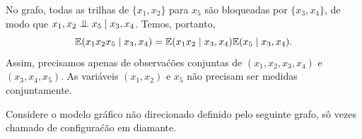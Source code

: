 \begin{exenumerate}
    \begin{solution}
        
        No grafo, todas as trilhas de $\{x_1,x_2\}$ para $x_5$ s\~ao bloqueadas por $\{x_3,x_4\}$, de modo que $x_1, x_2 \mathrel{\perp\mspace{-10mu}\perp} x_5 \mid x_3, x_4$. Temos, portanto,
        $$\mathbb{E} (x_1 x_2 x_5 \mid x_3,x_4) =  \mathbb{E} (x_1 x_2 \mid x_3,x_4)  \mathbb{E} (x_5 \mid x_3,x_4).$$
        Assim, precisamos apenas de observa\'c\~oes conjuntas de $(x_1, x_2, x_3, x_4)$ e $(x_3, x_4,x_5)$. As vari\'aveis $(x_1,x_2)$ e $x_5$ n\~ao precisam ser medidas conjuntamente.
        
    \end{solution}
    
\end{exenumerate}


\label{ex:factorisation-independencies-diamond}

Considere o modelo gr\'afico n\~ao direcionado definido pelo seguinte grafo, s\^o vezes chamado de configura\'c\~ao em diamante.

\begin{center}
\end{center}

